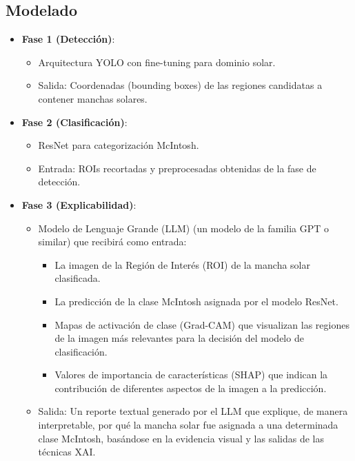 \documentclass[conference]{IEEEtran}
\begin{document}
\subsection*{Modelado}
\begin{itemize}
    \item \textbf{Fase 1 (Detección)}:
          \begin{itemize}
              \item Arquitectura YOLO con fine-tuning para dominio solar.
              \item Salida: Coordenadas (bounding boxes) de las regiones candidatas a contener manchas solares.
          \end{itemize}
    \item \textbf{Fase 2 (Clasificación)}:
          \begin{itemize}
              \item ResNet para categorización McIntosh.
              \item Entrada: ROIs recortadas y preprocesadas obtenidas de la fase de detección.
          \end{itemize}
    \item \textbf{Fase 3 (Explicabilidad)}:
          \begin{itemize}
              \item Modelo de Lenguaje Grande (LLM) (un modelo de la familia GPT o similar) que recibirá como entrada:
                    \begin{itemize}
                        \item La imagen de la Región de Interés (ROI) de la mancha solar clasificada.
                        \item La predicción de la clase McIntosh asignada por el modelo ResNet.
                        \item Mapas de activación de clase (Grad-CAM) que visualizan las regiones de la imagen más relevantes para la decisión del modelo de clasificación.
                        \item Valores de importancia de características (SHAP) que indican la contribución de diferentes aspectos de la imagen a la predicción.
                    \end{itemize}
              \item Salida: Un reporte textual generado por el LLM que explique, de manera interpretable, por qué la mancha solar fue asignada a una determinada clase McIntosh, basándose en la evidencia visual y las salidas de las técnicas XAI.
          \end{itemize}
\end{itemize}
\end{document}
